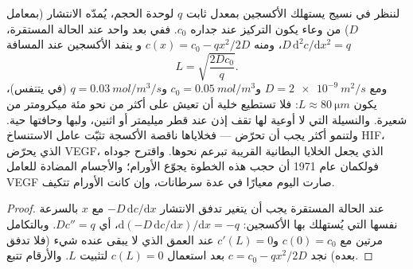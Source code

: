 \begin{proposition}\label{prop:b3:cancer-biology:oxygen}
لننظر في نسيج يستهلك الأكسجين بمعدل ثابت $q$ لوحدة الحجم،
يُمدّه الانتشار (بمعامل $D$) من وعاء يكون التركيز عند
جداره $c_{0}$. ففي بعد واحد عند الحالة المستقرة، $D\,
\mathrm{d}^{2}c/\mathrm{d}x^{2} = q$، ومنه $c(x) = c_{0} - qx^{2}/2D$ و
ينفد الأكسجين عند المسافة
\[
L = \sqrt{\frac{2Dc_{0}}{q}} .
\]
ومع $D = \qty{2e-9}{m^2/s}$ و$c_{0} = \qty{0.05}{mol/m^3}$ و$q =
\qty{0.03}{mol/m^3/s}$ (في  يتنفس)، يكون $L \approx \qty{80}{\micro
m}$: فلا تستطيع خلية أن تعيش على أكثر من نحو مئة ميكرومتر من
شعيرة. والنسيلة التي لا أوعية لها تقف إذن عند
قطر ميليمتر أو اثنين، ولبها  وحافتها
حية. ولتنمو أكثر يجب أن تحرّض \emph{} --- فخلاياها
ناقصة الأكسجة تثبّت عامل الاستنساخ HIF، الذي يحرّض
VEGF، الذي يجعل الخلايا البطانية القريبة تبرعم نحوها. واقترح جوداه
فولكمان عام 1971 أن حجب هذه الخطوة يجوّع الأورام؛
والأجسام المضادة للعامل VEGF صارت اليوم معيارًا في عدة سرطانات، وإن كانت
الأورام تتكيف.
\end{proposition}
\begin{proof}
عند الحالة المستقرة يجب أن يتغير تدفق الانتشار $-D\,\mathrm{d}c/\mathrm{d}x$
مع $x$ بالسرعة نفسها التي يُستهلك بها الأكسجين: $\mathrm{d}(-D\,
\mathrm{d}c/\mathrm{d}x)/\mathrm{d}x = -q$، أي $D c'' = q$.
وبالتكامل مرتين مع $c(0) = c_{0}$ و$c'(L) = 0$ عند العمق
الذي لا يبقى عنده شيء (فلا تدفق بعده) نجد $c = c_{0} - qx^{2}/2D$
بعد استعمال $c(L) = 0$ لتثبيت $L$. والأرقام تتبع.
\end{proof}

